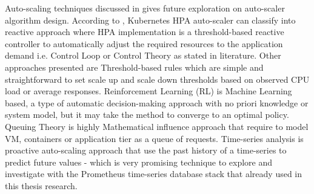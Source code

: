 Auto-scaling techniques discussed in \parencite{LoridoBotran} gives future exploration on auto-scaler algorithm design. According to \parencite{LoridoBotran}, Kubernetes HPA auto-scaler can classify into reactive approach where HPA implementation is a threshold-based reactive controller to automatically adjust the required resources to the application demand i.e. Control Loop or Control Theory as stated in literature. Other approaches presented are Threshold-based rules which are simple and straightforward to set scale up and scale down thresholds based on observed CPU load or average responses. Reinforcement Learning (RL) is Machine Learning based, a type of automatic decision-making approach with no priori knowledge or system model, but it may take the method to converge to an optimal policy. Queuing Theory is highly Mathematical influence approach that require to model VM, containers or application tier as a queue of requests. Time-series analysis is proactive auto-scaling approach that use the past history of a time-series to predict future values - which is very promising technique to explore and investigate with the Prometheus time-series database stack that already used in this thesis research.







